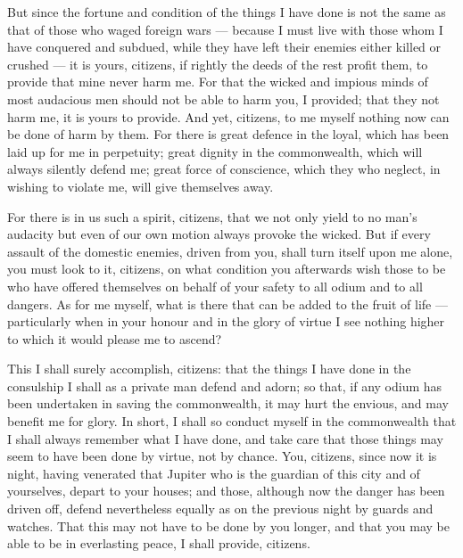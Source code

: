  But since the fortune and condition of the things I have done is not the same as that of those who waged foreign wars --- because I must live with those whom I have conquered and subdued, while they have left their enemies either killed or crushed --- it is yours, citizens, if rightly the deeds of the rest profit them, to provide that mine never harm me. For that the wicked and impious minds of most audacious men should not be able to harm you, I provided; that they not harm me, it is yours to provide. And yet, citizens, to me myself nothing now can be done of harm by them. For there is great defence in the loyal, which has been laid up for me in perpetuity; great dignity in the commonwealth, which will always silently defend me; great force of conscience, which they who neglect, in wishing to violate me, will give themselves away.

 For there is in us such a spirit, citizens, that we not only yield to no man's audacity but even of our own motion always provoke the wicked. But if every assault of the domestic enemies, driven from you, shall turn itself upon me alone, you must look to it, citizens, on what condition you afterwards wish those to be who have offered themselves on behalf of your safety to all odium and to all dangers. As for me myself, what is there that can be added to the fruit of life --- particularly when in your honour and in the glory of virtue I see nothing higher to which it would please me to ascend?

 This I shall surely accomplish, citizens: that the things I have done in the consulship I shall as a private man defend and adorn; so that, if any odium has been undertaken in saving the commonwealth, it may hurt the envious, and may benefit me for glory. In short, I shall so conduct myself in the commonwealth that I shall always remember what I have done, and take care that those things may seem to have been done by virtue, not by chance. You, citizens, since now it is night, having venerated that Jupiter who is the guardian of this city and of yourselves, depart to your houses; and those, although now the danger has been driven off, defend nevertheless equally as on the previous night by guards and watches. That this may not have to be done by you longer, and that you may be able to be in everlasting peace, I shall provide, citizens.

